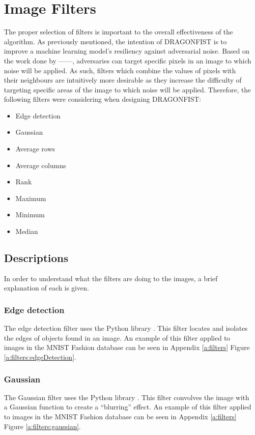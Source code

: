\section{Image Filters} \label{s:filters}
	The proper selection of filters is important to the overall effectiveness of the algorithm. As previously mentioned, the intention of DRAGONFIST is to improve a machine learning model's resiliency against adversarial noise. Based on the work done by ------, adversaries can target specific pixels in an image to which noise will be applied. As such, filters which combine the values of pixels with their neighbours are intuitively more desirable as they increase the difficulty of targeting specific areas of the image to which noise will be applied. Therefore, the following filters were considering when designing DRAGONFIST:
	\begin{multicols}{2}
		\begin{itemize}
			\item Edge detection
			\item Gaussian
			\item Average rows
			\item Average columns
			\item Rank
			\item Maximum
			\item Minimum
			\item Median
		\end{itemize}
	\end{multicols}

	\subsection{Descriptions} \label{s:filters:descriptions}
		In order to understand what the filters are doing to the images, a brief explanation of each is given.

		\subsubsection{Edge detection} \label{s:filters:descriptions:edgeDetection}
			The edge detection filter uses the Python library  \cite{skikitImage}. This filter locates and isolates the edges of objects found in an image. An example of this filter applied to images in the MNIST Fashion database \cite{zalandoresearchFashionMNIST} can be seen in Appendix \ref{a:filters} Figure \ref{a:filters:edgeDetection}.

		\subsubsection{Gaussian} \label{s:filters:descriptions:gaussian}
			The Gaussian filter uses the Python library  \cite{skikitImage}. This filter convolves the image with a Gaussian function to create a ``blurring'' effect. An example of this filter applied to images in the MNIST Fashion database \cite{zalandoresearchFashionMNIST} can be seen in Appendix \ref{a:filters} Figure \ref{a:filters:gaussian}.

